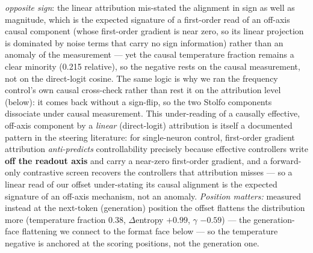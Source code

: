 \emph{opposite sign}: the linear attribution mis-stated the alignment in sign as
well as magnitude, which is the expected signature of a first-order read of an
off-axis causal component (whose first-order gradient is near zero, so its linear
projection is dominated by noise terms that carry no sign information) rather than
an anomaly of the measurement --- yet the causal temperature fraction remains a
clear minority (0.215 relative), so the negative rests on the causal measurement,
not on the direct-logit cosine. The same logic is why we ran the frequency
control's own causal cross-check rather than rest it on the attribution level
(below): it comes back without a sign-flip, so the two Stolfo components dissociate
under causal measurement. This under-reading of a causally effective, off-axis
component by a \emph{linear} (direct-logit) attribution is itself a documented
pattern in the steering literature: for single-neuron control, first-order gradient
attribution \emph{anti-predicts} controllability precisely because effective
controllers write \textbf{off the readout axis} and carry a near-zero first-order
gradient, and a forward-only contrastive screen recovers the controllers that
attribution misses \citep{LeverageIsNotReach} --- so a linear read of our offset
under-stating its causal alignment is the expected signature of an off-axis
mechanism, not an anomaly. \emph{Position matters:} measured instead at the
next-token (generation) position the offset flattens the distribution more
(temperature fraction 0.38, $\Delta$entropy $+0.99$, $\gamma$ $-0.59$) --- the
generation-face flattening we connect to the format face below --- so the
temperature negative is anchored at the scoring positions, not the generation one.

